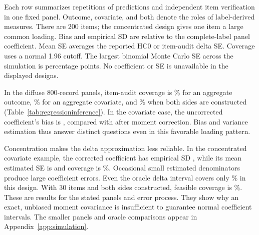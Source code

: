 \begin{table}[htbp]
\centering\small
\caption{Regression inference with reused labels in simulated panels of 800 records}
\label{tab:regressioninference}

\par\smallskip
\begin{minipage}{\linewidth}\footnotesize
Each row summarizes \SimulationReplications{} repetitions of predictions and
independent item verification in one fixed panel. Outcome, covariate, and
both denote the roles of label-derived measures. There are 200 items; the
concentrated design gives one item a large common loading. Bias and empirical
SD are relative to the complete-label panel coefficient. Mean SE averages
the reported HC0 or item-audit delta SE. Coverage uses a normal 1.96 cutoff.
The largest binomial Monte Carlo SE across the simulation is
\SimulationMaxMCSE{} percentage points. No coefficient or SE is unavailable
in the displayed designs.
\end{minipage}
\end{table}
\FloatBarrier

In the diffuse $800$-record panels, item-audit coverage is
\SimOutcomeDiffuseCoverage{}\% for an aggregate outcome,
\SimCovariateDiffuseCoverage{}\% for an aggregate covariate, and
\SimBothDiffuseCoverage{}\% when both sides are constructed
(Table~\ref{tab:regressioninference}). In the covariate case, the
uncorrected coefficient's bias is \SimCovariateDiffuseNaiveBias{}, compared
with \SimCovariateDiffuseAuditBias{} after moment correction. Bias and
variance estimation thus answer distinct questions even in this favorable
loading pattern.

Concentration makes the delta approximation less reliable. In the
concentrated covariate example, the corrected coefficient has empirical SD
\SimCovariateConcentratedSD{}, while its mean estimated SE is
\SimCovariateConcentratedSE{} and coverage is
\SimCovariateConcentratedCoverage{}\%. Occasional small estimated
denominators produce large coefficient errors. Even the oracle delta
interval covers only \SimCovariateConcentratedOracleCoverage{}\% in this
design. With $30$ items and both sides constructed, feasible coverage is
\SimFewBothCoverage{}\%. These are results for the stated panels and error
process. They show why an exact, unbiased moment covariance is insufficient
to guarantee normal coefficient intervals. The smaller panels and oracle
comparisons appear in Appendix~\ref{app:simulation}.

